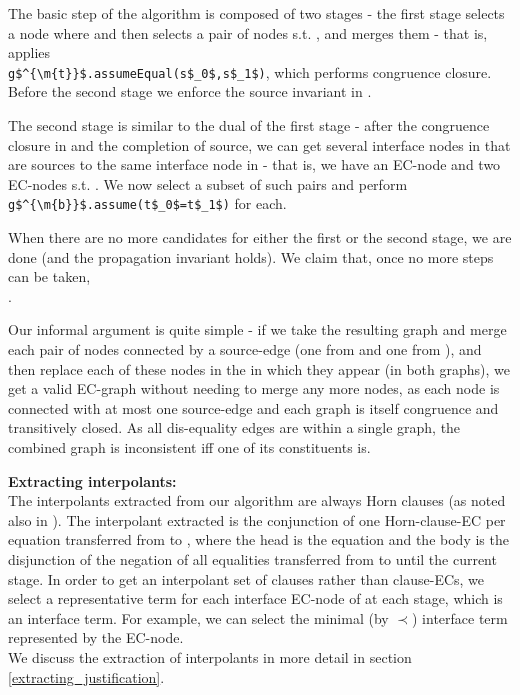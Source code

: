 The basic step of the algorithm is composed of two stages - the first stage selects a node  where  and then selects a pair of nodes 
 s.t. , and merges them - that is, applies \\
\lstinline|g$^{\m{t}}$.assumeEqual(s$_0$,s$_1$)|, which performs congruence closure.
Before the second stage we enforce the source invariant in .

The second stage is similar to the dual of the first stage - after the congruence closure in  and the completion of source, we can get several interface nodes in  that are sources to the same interface node in  - that is,
we have an EC-node  and two EC-nodes  s.t. . 
We now select a subset of such pairs  and perform \lstinline|g$^{\m{b}}$.assume(t$_0$=t$_1$)| for each.

When there are no more candidates for either the first or the second stage, we are done (and the propagation invariant holds). 
We claim that, once no more steps can be taken, \\ .

Our informal argument is quite simple - if we take the resulting graph and merge each pair of nodes connected by a source-edge (one from  and one from ), and then replace each of these nodes in the \GFAs{} in which they appear (in both graphs), 
we get a valid EC-graph without needing to merge any more nodes, as each node is connected with at most one source-edge and each graph is itself congruence and transitively closed. As all dis-equality edges are within a single graph, the combined graph is inconsistent iff one of its constituents is.


\textbf{Extracting interpolants:}\\
The interpolants extracted from our algorithm are always Horn clauses (as noted also in \cite{FuchsGoelGrundyKrsticTinelli2012}).
The interpolant extracted is the conjunction of one Horn-clause-EC per equation transferred from  to , 
where the head is the equation and the body is the disjunction of the negation of all equalities transferred from  to  until the current stage. In order to get an interpolant set of clauses rather than clause-ECs, we select a representative term for each interface EC-node of  at each stage, which is an interface term. For example, we can select the minimal (by $\prec$) interface term represented by the EC-node.\\
We discuss the extraction of interpolants in more detail in section \ref{extracting_justification}.

